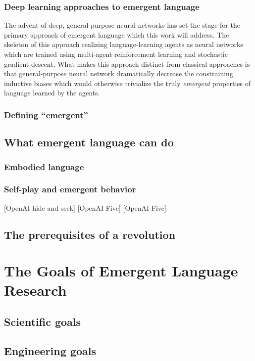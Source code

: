 \documentclass[letterpaper]{report}
\newcommand\cmg[1]{{\color{gray}[#1]}}
\begin{document}
\subsection{Deep learning approaches to emergent language}
The advent of deep, general-purpose neural networks has set the stage for the primary approach of emergent language which this work will address.
The skeleton of this approach realizing language-learning agents as neural networks which are trained using multi-agent reinforcement learning and stochastic gradient descent.
What makes this approach distinct from classical approaches is that general-purpose neural network dramatically decrease the constraining inductive biases which would otherwise trivialize the truly \emph{emergent} properties of language learned by the agents.

\subsection{Defining ``emergent''}

\section{What emergent language can do}
\subsection{Embodied language}
\citet{bisk_experience_2020}

\subsection{Self-play and emergent behavior}
\cmg{OpenAI hide and seek}
\cmg{OpenAI Five}
\cmg{OpenAI Five}
\section{The prerequisites of a revolution}

\chapter{The Goals of Emergent Language Research}
\section{Scientific goals}
\section{Engineering goals}
\end{document}
